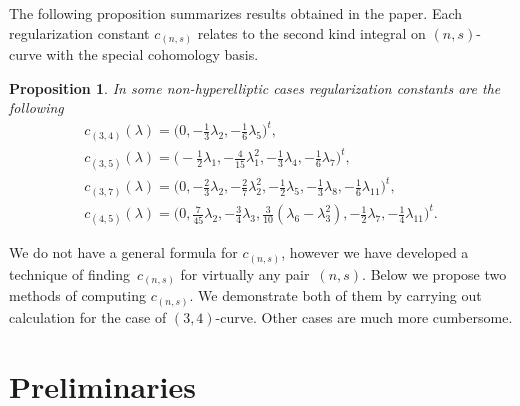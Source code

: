 \documentclass[11pt]{article}
\numberwithin{equation}{section}
\newtheorem{Proposition}[Theorem]{Proposition}
 { \theoremstyle{definition}
\newtheorem{Remark}[Theorem]{Remark} }
\begin{document}
The following proposition summarizes results obtained in the paper. Each regularization constant $c_{(n,s)}$ relates to the second kind integral on $(n,s)$-curve with the special cohomology basis.
\begin{Proposition}
In some non-hyperelliptic cases regularization constants are the following
 \begin{gather*}
 c_{(3,4)}(\lambda) = \big(0, -\tfrac{1}{3}\lambda_2, {-}\tfrac{1}{6}\lambda_5 \big)^t,\\
 c_{(3,5)}(\lambda) = \big({-}\tfrac{1}{2}\lambda_1, -\tfrac{4}{15}\lambda_1^2, -\tfrac{1}{3}\lambda_4, {-}\tfrac{1}{6}\lambda_7 \big)^t,\\
 c_{(3,7)}(\lambda) = \big(0,{-}\tfrac{2}{3}\lambda_2,{-}\tfrac{2}{7}\lambda_2^2,{-}\tfrac{1}{2}\lambda_5,
 {-}\tfrac{1}{3}\lambda_8,{-}\tfrac{1}{6}\lambda_{11}\big)^t,\\
 c_{(4,5)}(\lambda) = \big(0, \tfrac{7}{45}\lambda_2, -\tfrac{3}{4}\lambda_3, \tfrac{3}{10}(\lambda_6-\lambda_3^2),
 -\tfrac{1}{2}\lambda_7, {-}\tfrac{1}{4}\lambda_{11} \big)^t.
\end{gather*}
\end{Proposition}
We do not have a general formula for $c_{(n,s)}$, however we have developed a technique of finding~$c_{(n,s)}$ for virtually any pair~$(n,s)$. Below we propose two methods of computing $c_{(n,s)}$. We demonstrate both of them by carrying out calculation for the case of $(3,4)$-curve. Other cases are much more cumbersome.

\section{Preliminaries}\label{s:Prel}
\end{document}
